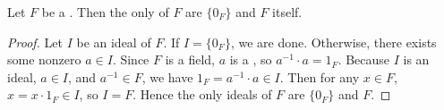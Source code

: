 \begin{proposition} \label{proposition:field_has_only_trivial_ideals}
Let $F$ be a . Then the only  of $F$ are $\{0_F\}$ and $F$ itself.
\end{proposition}

\begin{proof}
Let $I$ be an ideal of $F$. If $I = \{0_F\}$, we are done. Otherwise, there exists some nonzero $a \in I$. Since $F$ is a field, $a$ is a , so $a^{-1} \cdot a = 1_F$. Because $I$ is an ideal, $a \in I$, and $a^{-1} \in F$, we have $1_F = a^{-1} \cdot a \in I$. Then for any $x \in F$, $x = x \cdot 1_F \in I$, so $I = F$. Hence the only ideals of $F$ are $\{0_F\}$ and $F$.
\end{proof}